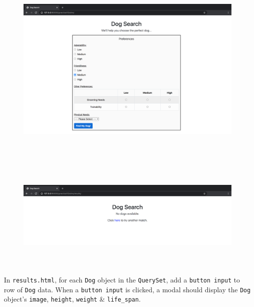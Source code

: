 \documentclass{article}
\begin{document}
\begin{figure}[H]
  \includegraphics[width=175mm, height=100mm]{./img/10-expected-dog-search-3.png}
  \includegraphics[width=175mm, height=55mm]{./img/10-expected-dog-search-4.png}
\end{figure}

In \texttt{results.html}, for each \texttt{Dog} object in the \texttt{QuerySet}, add a \texttt{button input} to row of \texttt{Dog} data. When a \texttt{button input} is clicked, a modal should display the \texttt{Dog} object's \texttt{image}, \texttt{height}, \texttt{weight} \& \texttt{life\_span}. 
\end{document}

